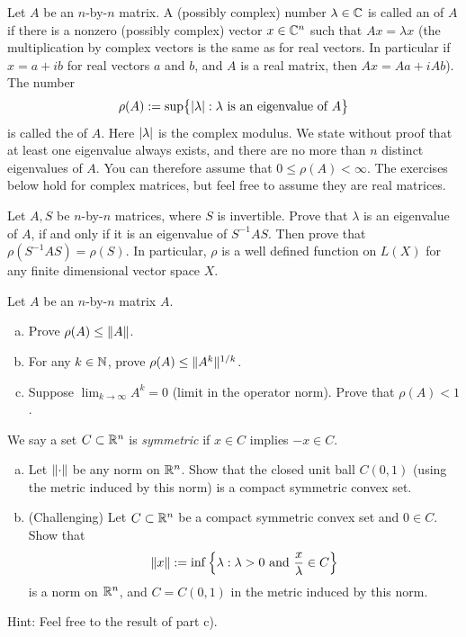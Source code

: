 \begin{exnote}
Let $A$ be an $n$-by-$n$ matrix.
A (possibly complex) number $\lambda \in {\mathbb{C}}$ is called an \emph{} of $A$
if there is a nonzero (possibly complex) vector $x \in {\mathbb{C}}^n$ such that $Ax = \lambda
x$ (the multiplication by complex vectors is the same as for real vectors. In particular if $x =
a+ib$ for real vectors $a$ and $b$, and $A$ is a real matrix, then $Ax = Aa + i Ab$).
The number
\begin{equation*}
\rho(A) :=
\sup \bigl\{ \left\lvert {\lambda} \right\rvert : \lambda \text{ is an eigenvalue of $A$} \bigr\}
\end{equation*}
is called the \emph{} of $A$.  Here $\left\lvert {\lambda} \right\rvert$ is the complex
modulus.  We state without proof that at least one eigenvalue always exists,
and there are no more than $n$ distinct eigenvalues of $A$.  You can
therefore assume that $0 \leq \rho(A) < \infty$.
The exercises below hold for complex matrices, but feel free to assume they
are real matrices.
\end{exnote}

\begin{exercise}
Let $A,S$ be $n$-by-$n$ matrices, where $S$ is invertible.
Prove that $\lambda$ is an eigenvalue of $A$, if and only
if it is an eigenvalue of $S^{-1}AS$.  Then prove that
$\rho(S^{-1}AS) = \rho(S)$.
In particular, $\rho$ is a well defined function on $L(X)$ for
any finite dimensional vector space $X$.
\end{exercise}

\begin{exercise}
Let $A$ be an $n$-by-$n$ matrix $A$.
\begin{enumerate}[a)]
\item
Prove $\rho(A) \leq \lVert {A} \rVert$.
\item
For any $k \in {\mathbb{N}}$, prove
$\rho(A) \leq \lVert {A^k} \rVert^{1/k}$.
\item
Suppose $\displaystyle \lim_{k\to\infty} A^k = 0$ (limit in the operator norm).
Prove that $\rho(A) < 1$.
\end{enumerate}
\end{exercise}

\begin{exercise}
We say a set $C \subset {\mathbb{R}}^n$ is \emph{symmetric} if
$x \in C$ implies $-x \in C$.
\begin{enumerate}[a)]
\item
Let $\lVert {\cdot} \rVert$ be any norm on ${\mathbb{R}}^n$.  Show that the closed unit ball
$C(0,1)$ (using the metric induced by this norm)
is a compact symmetric convex set.
\item (Challenging)
Let $C \subset {\mathbb{R}}^n$ be a compact symmetric convex set and $0 \in C$.  Show that
\begin{equation*}
\lVert {x} \rVert := \inf \left\{ \lambda : \lambda > 0 \text{ and } \frac{x}{\lambda} \in C \right\}
\end{equation*}
is a norm on ${\mathbb{R}}^n$, and $C = C(0,1)$ in the metric induced by this norm.
\end{enumerate}
Hint: Feel free to the result of  part c).
\end{exercise}

